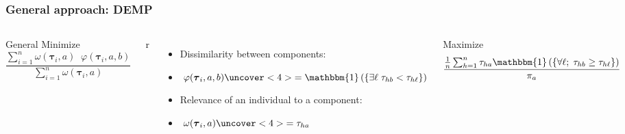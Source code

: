 \begin{frame}[t]
\frametitle{General approach: DEMP}
\small
\begin{columns}
\begin{block}{General}
Minimize
\[
\frac{ 
\sum_{i=1}^n \omega(\boldsymbol\tau_i, a) \;\; \varphi(\boldsymbol\tau_i, a, b) 
}{ 
\sum_{i=1}^n \omega(\boldsymbol\tau_i, a)
}
\]
\end{block}r

\medskip
\medskip

\begin{itemize}
\item Dissimilarity between components: 
\item[] $\; \varphi(\boldsymbol\tau_i, a, b) \uncover<4>{ = \mathbbm{1}\left( \{ \exists \ell \; \tau_{hb} < \tau_{h\ell}  \} \right) }$
\item Relevance of an individual to a component: 
\item[] $\; \omega(\boldsymbol\tau_i, a) \uncover<4>{ = \tau_{ha}}$
\end{itemize}


%
Maximize \[ \frac{ \frac{1}{n} \sum_{h=1}^n \tau_{ha} \mathbbm{1}\left( \{ \forall \ell; \; \tau_{hb} \geq \tau_{h\ell}  \} \right) }{ \pi_a } \]
\end{columns}

\end{frame} 


